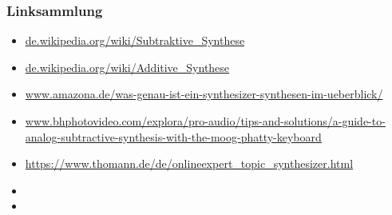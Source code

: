 \documentclass[11pt,ngerman]{beamer}
\begin{document}
\begin{frame}[allowframebreaks]
\frametitle{Linksammlung}


\begin{itemize}
\item \url{de.wikipedia.org/wiki/Subtraktive_Synthese}
\item \url{de.wikipedia.org/wiki/Additive_Synthese}
\item \url{www.amazona.de/was-genau-ist-ein-synthesizer-synthesen-im-ueberblick/}
\item \url{www.bhphotovideo.com/explora/pro-audio/tips-and-solutions/a-guide-to-analog-subtractive-synthesis-with-the-moog-phatty-keyboard}
\item \url{https://www.thomann.de/de/onlineexpert_topic_synthesizer.html}
\item 
\item 
\end{itemize}
\end{frame} 
 
 
 
\end{document}
